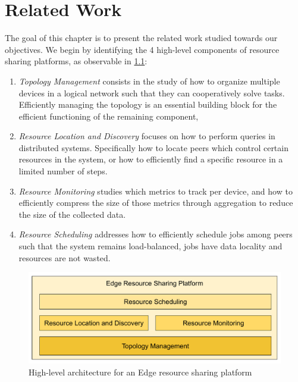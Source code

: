 \chapter{Related Work} 
\label{cha:related_work}

The goal of this chapter is to present the related work studied towards our objectives. We begin by identifying the 4 high-level components of resource sharing platforms, as observable in \ref{fig:proposed_architecture}:

\begin{enumerate}

    \item \textit{Topology Management} consists in the study of how to organize multiple devices in a logical network such that they can cooperatively solve tasks. Efficiently managing the topology is an essential building block for the efficient functioning of the remaining component,
    
    \item \textit{Resource Location and Discovery} focuses on how to perform queries in distributed systems. Specifically how to locate peers which control certain resources in the system, or how to efficiently find a specific resource in a limited number of steps.
    
    \item \textit{Resource Monitoring} studies which metrics to track per device, and how to efficiently compress the size of those metrics through aggregation to reduce the size of the collected data.

    \item \textit{Resource Scheduling} addresses how to efficiently schedule jobs among peers such that the system remains load-balanced, jobs have data locality and resources are not wasted.

\end{enumerate}

\begin{figure}[h]
    \centering
    \includegraphics[width=\linewidth]{Figures/proposed_architecture.pdf}
    \caption{High-level architecture for an Edge resource sharing platform}
    \label{fig:proposed_architecture}
\end{figure}

